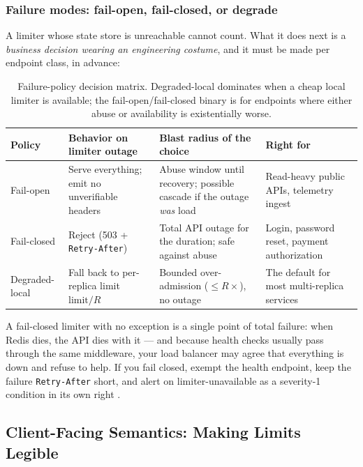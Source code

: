 \subsubsection{Failure modes: fail-open, fail-closed, or degrade}
\label{subsec:ch14-failopen}
A limiter whose state store is unreachable cannot count. What it does next
is a \emph{business decision wearing an engineering costume}, and it must be
made per endpoint class, in advance:

\begin{table}[ht]
  \centering
  \small
  \begin{tabularx}{\textwidth}{l X X X}
    \toprule
    \textbf{Policy} & \textbf{Behavior on limiter outage} &
    \textbf{Blast radius of the choice} & \textbf{Right for} \\
    \midrule
    Fail-open & Serve everything; emit no unverifiable headers &
      Abuse window until recovery; possible cascade if the outage
      \emph{was} load & Read-heavy public APIs, telemetry ingest \\
    Fail-closed & Reject (503 + \texttt{Retry-After}) &
      Total API outage for the duration; safe against abuse &
      Login, password reset, payment authorization \\
    Degraded-local & Fall back to per-replica limit $\mathrm{limit}/R$ &
      Bounded over-admission ($\le R\times$), no outage &
      The default for most multi-replica services \\
    \bottomrule
  \end{tabularx}
  \caption{Failure-policy decision matrix. Degraded-local dominates when a
  cheap local limiter is available; the fail-open/fail-closed binary is for
  endpoints where either abuse or availability is existentially worse.}
  \label{tab:ch14-failmatrix}
\end{table}

\begin{warningbox}
A fail-closed limiter with no exception is a single point of total failure:
when Redis dies, the API dies with it --- and because health checks usually
pass through the same middleware, your load balancer may agree that
everything is down and refuse to help. If you fail closed, exempt the
health endpoint, keep the failure \texttt{Retry-After} short, and alert on
limiter-unavailable as a severity-1 condition in its own right
\cite{nygard2018releaseit}.
\end{warningbox}

\subsection{Client-Facing Semantics: Making Limits Legible}
\label{subsec:ch14-headers}

